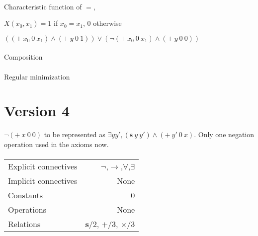 \documentclass{article}
\begin{document}
\paragraph{}
Characteristic function of $=$,

$X(x_{0},x_{1}) = 1$ if $x_{0} = x_{1}$, $0$ otherwise


$((+\ x_{0}\ 0\ x_{1}) \land (+\ y\ 0\ 1)) \lor (\neg(+\ x_{0}\ 0\ x_{1}) \land (+\ y\ 0\ 0))$


\paragraph{}
Composition

\paragraph{}
Regular minimization


\section{Version 4}

$\neg(+\ x\ 0\ 0)$ to be represented as $\exists y y', (\mathbf{s}\ y\ y') \land (+\ y'\ 0\ x)$. Only one negation operation used in the axioms now. 

\paragraph{}
\begin{tabular}{l | r}
 \hline
 Explicit connectives & $\neg$,$\rightarrow $,$\forall$,$\exists$ \\
 Implicit connectives & None \\
 Constants & 0 \\
 Operations & None \\
 Relations & $\mathbf{s}$/2, $+$/3, $\times$/3\\
 \hline
\end{tabular}
\end{document}
